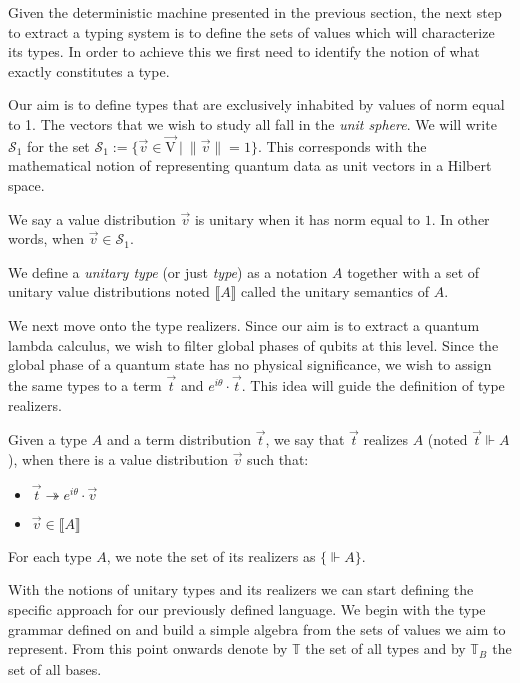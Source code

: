 \documentclass[runningheads,orivec]{llncs}
\newcommand\s[1]{\ensuremath{\mathsf{#1}}}
\newcommand\Val{{\s V}}
\def\Val{\mathrm{V}}          %
\def\Sph{\mathcal{S}_1}       %
\def\Type{\mathbb{T}}
\def\BasisType{\Type_{\basis{}}}
\def\sem#1{\llbracket#1\rrbracket}
\def\real{\Vdash}
\newcommand\basis[1]{\ensuremath{B_{ #1 }}}
\begin{document}
Given the deterministic machine presented in the previous section, the next step to extract a typing system is to define the sets of values which will characterize its types. In order to achieve this we first need to identify the notion of what exactly constitutes a type.

Our aim is to define types that are exclusively inhabited by values of norm equal to 1. The vectors that we wish to study all fall in the \emph{unit sphere}. We will write $\Sph$ for the set $\Sph := \{\vec v \in \vec{\Val}~|~\|\vec v\| =1\}$. This corresponds with the mathematical notion of representing quantum data as unit vectors in a Hilbert space. 

\begin{definition}
  We say a value distribution $\vec{v}$ is unitary when it has norm equal to $1$. In other words, when $\vec{v}\in\Sph$.
\end{definition}

\begin{definition}
  We define a \textit{unitary type} (or just \textit{type}) as a notation $A$ together with a set of unitary value distributions noted $\sem{A}$ called the unitary semantics of $A$.
\end{definition}

We next move onto the type realizers. Since our aim is to extract a quantum lambda calculus, we wish to filter global phases of qubits at this level. Since the global phase of a quantum state has no physical significance, we wish to assign the same types to a term $\vec{t}$ and $e^{i\theta}\cdot\vec{t}$. This idea will guide the definition of type realizers.

\begin{definition}
  Given a type $A$ and a term distribution $\vec t$, we say that $\vec t$ realizes $A$ (noted $\vec t \real A$), when there is a value distribution $\vec v$ such that:
  \begin{itemize}
    \item $\vec{t}\twoheadrightarrow e^{i\theta}\cdot\vec{v}$
    \item $\vec{v}\in\sem{A}$
  \end{itemize}
  For each type $A$, we note the set of its realizers as $\{\real A\}$.
\end{definition}

With the notions of unitary types and its realizers we can start defining the specific approach for our previously defined language. We begin with the type grammar defined on  and build a simple algebra from the sets of values we aim to represent. From this point onwards denote by $\Type$ the set of all types and by $\BasisType$ the set of all bases.
\end{document}
